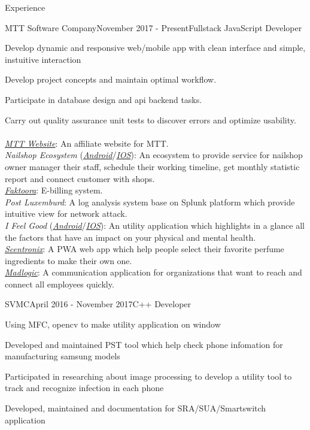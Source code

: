 \documentclass{resume}
\begin{document}
  \begin{rSection}{Experience}
    \begin{rSubsection}{MTT Software Company}{November 2017 - Present}{Fullstack JavaScript Developer}{}
    \item Develop dynamic and responsive web/mobile app with clean interface and simple, instuitive interaction
    \item Develop project concepts and maintain optimal workflow.
    \item Participate in database design and api backend tasks.
    \item Carry out quality assurance unit tests to discover errors and optimize usability.
    \\\\
    \href{https://mttjsc.com/}{\emph{MTT Website}}: An affiliate website for MTT.
    \\\emph{Nailshop Ecosystem} (\href{https://play.google.com/store/apps/developer?id=MTT+Software+Company+LTD/}{\emph{Android}}/\href{https://apps.apple.com/us/developer/mttjsc/id1250334932}{\emph{IOS}}): 
    An ecosystem to provide service for nailshop owner manager their
    staff, schedule their working timeline, get monthly statistic report and connect customer with shops.
    \\\href{http://app.faktoora.com}{\emph{Faktoora}}: E-billing system.
    \\\emph{Post Luxemburd}: A log analysis system base on Splunk platform which provide intuitive view for network attack.
    \\\emph{I Feel Good} (\href{https://play.google.com/store/apps/details?id=com.ifg_mobile}{\emph{Android}}/\href{}{\emph{IOS}}): 
    An utility application which highlights in a glance all the factors that have an impact on your physical and mental health.
    \\\href{https://app.scnt.me/}{\emph{Scentronix}}: A PWA web app which help people select their favorite perfume ingredients to make their own one.
    \\\href{https://www.madlogic.nl/magic/}{\emph{Madlogic}}: A communication application for organizations that want to reach and connect all employees quickly.
    \end{rSubsection}
  
    \begin{rSubsection}{SVMC}{April 2016 - November 2017}{C++ Developer}{}
    \item Using MFC, opencv to make utility application on window
    \item Developed and maintained PST tool which help check phone infomation for manufacturing samsung models
    \item Participated in researching about image processing to develop a utility tool to track and recognize infection in each phone
    \item Developed, maintained and documentation for SRA/SUA/Smartswitch application
    \end{rSubsection}
  
  \end{rSection}
\end{document}
